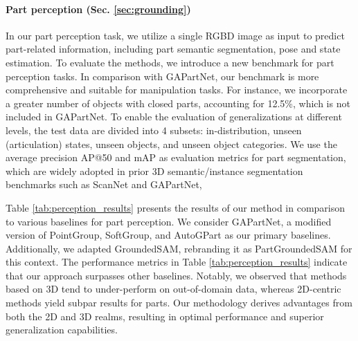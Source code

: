  






\paragraph{Part perception (Sec. \ref{sec:grounding})}
In our part perception task, we utilize a single RGBD image as input to predict part-related information, including part semantic segmentation, pose and state estimation. To evaluate the methods, we introduce a new benchmark for part perception tasks. In comparison with GAPartNet, our benchmark is more comprehensive and suitable for manipulation tasks. For instance, we incorporate a greater number of objects with closed parts, accounting for 12.5\%, which is not included in GAPartNet\citep{geng2022gapartnet}.
%
To enable the evaluation of generalizations at different levels, the test data are divided into 4 subsets: in-distribution, unseen (articulation) states, unseen objects, and unseen object categories.
We use the average precision AP@50 and mAP as evaluation metrics for part segmentation, which are widely adopted in prior 3D semantic/instance segmentation benchmarks such as ScanNet\citep{dai2017scannet} and GAPartNet\citep{geng2022gapartnet},

Table \ref{tab:perception_results} presents the results of our method in comparison to various baselines for part perception. We consider GAPartNet\citep{geng2022gapartnet}, a modified version of PointGroup\citep{jiang2020pointgroup}, SoftGroup\citep{vu2022softgroup}, and AutoGPart \citep{liu2022autogpart} as our primary baselines. Additionally, we adapted GroundedSAM, rebranding it as PartGroundedSAM for this context. The performance metrics in Table \ref{tab:perception_results} indicate that our approach surpasses other baselines. Notably, we observed that methods based on 3D tend to under-perform on out-of-domain data, whereas 2D-centric methods yield subpar results for parts. Our methodology derives advantages from both the 2D and 3D realms, resulting in optimal performance and superior generalization capabilities.


